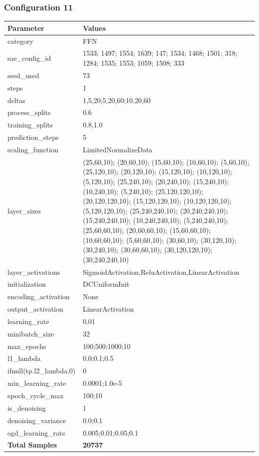 \documentclass[a4paper,11pt,oneside]{article}
\theoremstyle{plain}
\theoremstyle{definition}
\begin{document}
	\newpage
	\subsubsection{Configuration 11}\label{config11}
	\begin{longtable}[H]{|p{0.3\linewidth}|p{0.7\linewidth}|} \hline 			\rowcolor{beaublue}\textbf{Parameter} &\textbf{Values} \\\hline{category} & {FFN} \\\hline
		{sae\_config\_id} & {1533; 1497; 1554; 1639; 147; 1534; 1468; 1501; 318; 1284; 1535; 1553; 1059; 1508; 333} \\\hline
		{seed\_used} & {73} \\\hline
		{steps} & {1} \\\hline
		{deltas} & {1,5,20;5,20,60;10,20,60} \\\hline
		{process\_splits} & {0.6} \\\hline
		{training\_splits} & {0.8,1.0} \\\hline
		{prediction\_steps} & {5} \\\hline
		{scaling\_function} & {LimitedNormalizeData} \\\hline
		{layer\_sizes} & {(25,60,10); (20,60,10); (15,60,10); (10,60,10); (5,60,10); (25,120,10); (20,120,10); (15,120,10); (10,120,10); (5,120,10); (25,240,10); (20,240,10); (15,240,10); (10,240,10); (5,240,10); (25,120,120,10); (20,120,120,10); (15,120,120,10); (10,120,120,10); (5,120,120,10); (25,240,240,10); (20,240,240,10); (15,240,240,10); (10,240,240,10); (5,240,240,10); (25,60,60,10); (20,60,60,10); (15,60,60,10); (10,60,60,10); (5,60,60,10); (30,60,10); (30,120,10); (30,240,10); (30,60,60,10); (30,120,120,10); (30,240,240,10)} \\\hline
		{layer\_activations} & {SigmoidActivation,ReluActivation,LinearActivation} \\\hline
		{initialization} & {DCUniformInit} \\\hline
		{encoding\_activation} & {None} \\\hline
		{output\_activation} & {LinearActivation} \\\hline
		{learning\_rate} & {0.01} \\\hline
		{minibatch\_size} & {32} \\\hline
		{max\_epochs} & {100;500;1000;10} \\\hline
		{l1\_lambda} & {0.0;0.1;0.5} \\\hline
		{ifnull(tp.l2\_lambda,0)} & {0} \\\hline
		{min\_learning\_rate} & {0.0001;1.0e-5} \\\hline
		{epoch\_cycle\_max} & {100;10} \\\hline
		{is\_denoising} & {1} \\\hline
		{denoising\_variance} & {0.0;0.1} \\\hline
		{ogd\_learning\_rate} & {0.005;0.01;0.05;0.1} \\\hline
		{\textbf{Total Samples}} & {\textbf{20737}} \\\hline
	\end{longtable}
	
\end{document}

